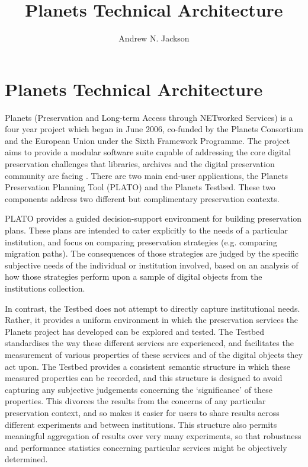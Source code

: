 \documentclass{article}
\begin{document}
\title{Planets Technical Architecture}

\author{Andrew N. Jackson}


\maketitle

\section{Planets Technical Architecture}
Planets (Preservation and Long-term Access through NETworked Services) is a four
year project which began in June 2006, co-funded by the Planets Consortium and
the European Union under the Sixth Framework Programme. The project aims to
provide a modular software suite capable of addressing the core digital
preservation challenges that libraries, archives and the digital preservation
community are facing \cite{af-planets-2007}. There are two main end-user
applications, the Planets Preservation Planning Tool (PLATO) and the Planets
Testbed.  These two components address two different but complimentary
preservation contexts.

PLATO \cite{plato2008} provides a guided decision-support environment for
building preservation plans.  These plans are intended to cater explicitly to the
needs of a particular institution, and focus on comparing preservation strategies
(e.g. comparing migration paths).  The consequences of those strategies are
judged by the specific subjective needs of the individual or institution
involved, based on an analysis of how those strategies perform upon a sample of
digital objects from the institutions collection.

In contrast, the Testbed does not attempt to directly capture institutional
needs. Rather, it provides a uniform environment in which the preservation
services the Planets project has developed can be explored and tested. The
Testbed standardises the way these different services are experienced, and
facilitates the measurement of various properties of these services and of the
digital objects they act upon. The Testbed provides a consistent semantic
structure in which these measured properties can be recorded, and this structure
is designed to avoid capturing any subjective judgements concerning the
`significance' of these properties. This divorces the results from the concerns
of any particular preservation context, and so makes it easier for users to share
results across different experiments and between institutions. This structure
also permits meaningful aggregation of results over very many experiments, so
that robustness and performance statistics concerning particular services might
be objectively determined.
\end{document}
